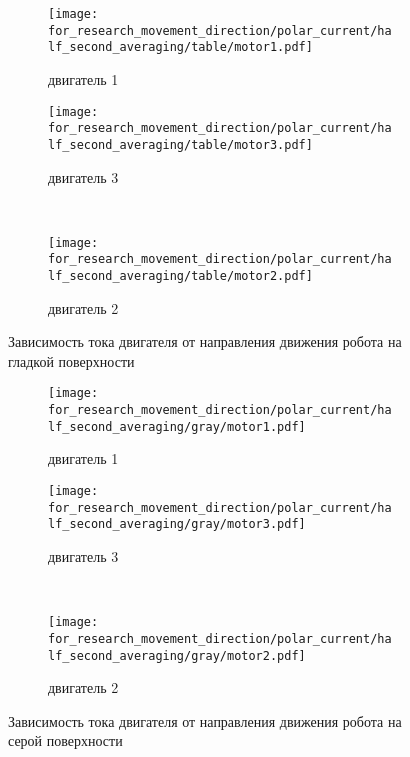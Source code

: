 \begin{figure}[H]
    \centering
    \begin{subfigure}{0.45\textwidth}
        \centering
        \texttt{[image: for\_research\_movement\_direction/polar\_current/half\_second\_averaging/table/motor1.pdf]}
        \caption{двигатель 1}
    \end{subfigure}
    \hspace{0.005\textwidth}
    \begin{subfigure}{0.45\textwidth}
        \centering
        \texttt{[image: for\_research\_movement\_direction/polar\_current/half\_second\_averaging/table/motor3.pdf]}
        \caption{двигатель 3}
    \end{subfigure} \\
    \vspace{4pt}
    \centering
    \begin{subfigure}{0.45\textwidth}
        \centering
        \texttt{[image: for\_research\_movement\_direction/polar\_current/half\_second\_averaging/table/motor2.pdf]}
        \caption{двигатель 2}
    \end{subfigure}
    \caption{Зависимость тока двигателя от направления движения робота на гладкой поверхности}
\end{figure}

\begin{figure}[H]
    \centering
    \begin{subfigure}{0.49\textwidth}
        \centering
        \texttt{[image: for\_research\_movement\_direction/polar\_current/half\_second\_averaging/gray/motor1.pdf]}
        \caption{двигатель 1}
    \end{subfigure}
    \hspace{0.005\textwidth}
    \begin{subfigure}{0.49\textwidth}
        \centering
        \texttt{[image: for\_research\_movement\_direction/polar\_current/half\_second\_averaging/gray/motor3.pdf]}
        \caption{двигатель 3}
    \end{subfigure} \\
    \vspace{4pt}
    \centering
    \begin{subfigure}{0.49\textwidth}
        \centering
        \texttt{[image: for\_research\_movement\_direction/polar\_current/half\_second\_averaging/gray/motor2.pdf]}
        \caption{двигатель 2}
    \end{subfigure}
    \caption{Зависимость тока двигателя от направления движения робота на серой поверхности}
\end{figure}

